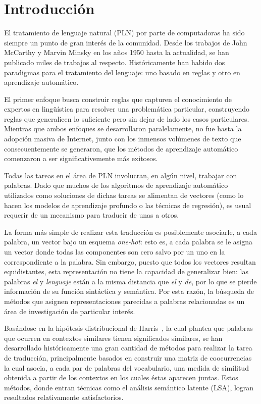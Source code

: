 \chapter{Introducción}

El tratamiento de lenguaje natural (PLN) por parte de computadoras ha sido siempre un punto de gran
interés de la comunidad. Desde los trabajos de John McCarthy y Marvin Minsky en los años 1950 hasta
la actualidad, se han publicado miles de trabajos al respecto. Históricamente han habido dos
paradigmas para el tratamiento del lenguaje: uno basado en reglas y otro en aprendizaje automático.

El primer enfoque busca construir reglas que capturen el conocimiento de expertos en lingüística
para resolver una problemática particular, construyendo reglas que generalicen lo suficiente pero
sin dejar de lado los casos particulares. Mientras que ambos enfoques se desarrollaron
paralelamente, no fue hasta la adopción masiva de Internet, junto con los inmensos volúmenes de
texto que consecuentemente se generaron, que los métodos de aprendizaje automático comenzaron a ser
significativemente más exitosos.

Todas las tareas en el área de PLN involucran, en algún nivel, trabajar con palabras. Dado que
muchos de los algoritmos de aprendizaje automático utilizados como soluciones de dichas tareas se
alimentan de vectores (como lo hacen los modelos de aprendizaje profundo o las técnicas de
regresión), es usual requerir de un mecanismo para traducir de unas a otros.

La forma más simple de realizar esta traducción es posiblemente asociarle, a cada palabra, un vector
bajo un esquema \textit{one-hot}: esto es, a cada palabra se le asigna un vector donde todas las
componentes son cero salvo por un uno en la correspondiente a la palabra. Sin embargo, puesto que
todos los vectores resultan equidistantes, esta representación no tiene la capacidad de generalizar
bien: las palabras \textit{el} y \textit{lenguaje} están a la misma distancia que \textit{el} y
\textit{de}, por lo que se pierde información de su función sintáctica y semántica. Por esta razón,
la búsqueda de métodos que asignen representaciones parecidas a palabras relacionadas es un área de
investigación de particular interés.

Basándose en la hipótesis distribucional de Harris~\cite{Harris1954}, la cual plantea que palabras
que ocurren en contextos similares tienen significados similares, se han desarrollado históricamente
una gran cantidad de métodos para realizar la tarea de traducción, principalmente basados en
construir una matriz de coocurrencias la cual asocia, a cada par de palabras del vocabulario, una
medida de similitud obtenida a partir de los contextos en los cuales éstas aparecen juntas. Estos
métodos, donde entran técnicas como el análisis semántico latente (LSA), logran resultados
relativamente satisfactorios.


